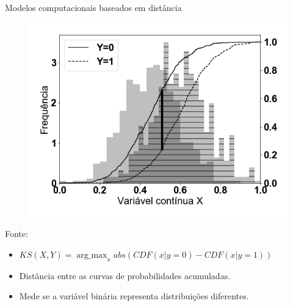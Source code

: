 \begin{frame}{Modelos computacionais baseados em distância}
	\begin{tcolorbox}[colback=blue!5!white,colframe=blue!75!black,title=Distância Komogorov-Smirnov,height=5cm,valign=center]\selectFont
		\selectFont
		\begin{center}
			\begin{figure}[]
				\includegraphics[scale=0.20]{images/KS_teorico.png}
				\label{fig:ksTeorico}
			\end{figure}
			Fonte: \SourcePadrao
		\end{center}
	\end{tcolorbox}


	\begin{tcolorbox}[colback=blue!5!white,colframe=blue!75!black,title=Definição e propriedades,valign=center]\selectFont
	\begin{itemize}
		\item $KS(X,Y) = \operatorname*{arg\_max}_x abs(CDF(x | y=0)- CDF(x | y=1))$
		\item Distância entre as curvas de probabilidades acumuladas.
		\item Mede se a variável binária representa distribuições diferentes.
	\end{itemize}
	\end{tcolorbox}
\end{frame}


